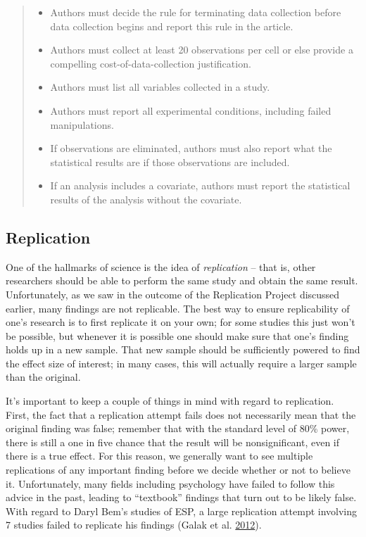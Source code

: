 \documentclass[12pt,]{book}
\providecommand{\tightlist}{%
  \setlength{\itemsep}{0pt}\setlength{\parskip}{0pt}}
\theoremstyle{definition}
\theoremstyle{definition}
\theoremstyle{definition}
\theoremstyle{remark}
\begin{document}
\begin{quote}
\begin{itemize}
\tightlist
\item
  Authors must decide the rule for terminating data collection before data collection begins and report this rule in the article.
\item
  Authors must collect at least 20 observations per cell or else provide a compelling cost-of-data-collection justification.
\item
  Authors must list all variables collected in a study.
\item
  Authors must report all experimental conditions, including failed manipulations.
\item
  If observations are eliminated, authors must also report what the statistical results are if those observations are included.
\item
  If an analysis includes a covariate, authors must report the statistical results of the analysis without the covariate.
\end{itemize}
\end{quote}

\hypertarget{replication}{%
\subsection{Replication}\label{replication}}

One of the hallmarks of science is the idea of \emph{replication} -- that is, other researchers should be able to perform the same study and obtain the same result. Unfortunately, as we saw in the outcome of the Replication Project discussed earlier, many findings are not replicable. The best way to ensure replicability of one's research is to first replicate it on your own; for some studies this just won't be possible, but whenever it is possible one should make sure that one's finding holds up in a new sample. That new sample should be sufficiently powered to find the effect size of interest; in many cases, this will actually require a larger sample than the original.

It's important to keep a couple of things in mind with regard to replication. First, the fact that a replication attempt fails does not necessarily mean that the original finding was false; remember that with the standard level of 80\% power, there is still a one in five chance that the result will be nonsignificant, even if there is a true effect. For this reason, we generally want to see multiple replications of any important finding before we decide whether or not to believe it. Unfortunately, many fields including psychology have failed to follow this advice in the past, leading to ``textbook'' findings that turn out to be likely false. With regard to Daryl Bem's studies of ESP, a large replication attempt involving 7 studies failed to replicate his findings (Galak et al. \protect\hyperlink{ref-gala:lebo:nels:2012}{2012}).
\end{document}
